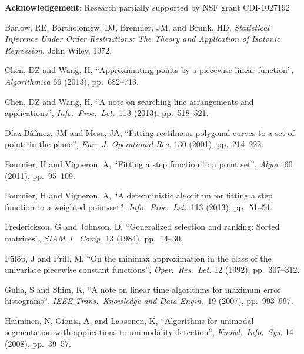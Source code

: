 \documentclass[11pt]{article}
\newcommand{\bibshrink}{\vspace{-0.04in}}
\begin{document}
\medskip
\noindent \textbf{Acknowledgement}: Research partially supported by NSF grant CDI-1027192




\begin{thebibliography}{99}


 Barlow, RE, Bartholomew, DJ, Bremner, JM, and Brunk, HD,
  \textit{Statistical Inference Under Order Restrictions: The Theory and Application of Isotonic Regression}, John Wiley, 1972.
\bibshrink
  
  Chen, DZ and Wang, H,
  ``Approximating points by a piecewise linear function'',
  \textit{Algorithmica} 66 (2013), pp.\ 682--713.
\bibshrink

 Chen, DZ and Wang, H,
  ``A note on searching line arrangements and applications'',
  \textit{Info.\ Proc.\ Let.}\ 113 (2013), pp.~518--521.
\bibshrink
  
  D\'{i}az-B\'{a}\~{n}nez, JM and Mesa, JA,
  ``Fitting rectilinear polygonal curves to a set of points in the plane'',
  \textit{Eur.\ J. Operational Res.} 130 (2001), pp.~214--222.
\bibshrink
   
 Fournier, H and Vigneron, A,
  ``Fitting a step function to a point set'',
  \textit{Algor.} 60 (2011), pp.~95--109.
\bibshrink
  
 Fournier, H and Vigneron, A,
  ``A deterministic algorithm for fitting a step function to a weighted point-set'',
  \textit{Info.\ Proc.\ Let.}\ 113 (2013), pp.\ 51--54.
\bibshrink
  
  Frederickson, G and Johnson, D,
  ``Generalized selection and ranking: Sorted matrices'',
  \textit{SIAM J.\ Comp.} 13 (1984), pp.~14--30.
\bibshrink
  
 F\"{u}l\"{o}p, J and Prill, M,
  ``On the minimax approximation in the class of the univariate piecewise constant functions'',
  \textit{Oper.\ Res.\ Let.} 12 (1992), pp.~307--312.
\bibshrink
  
  Guha, S and Shim, K,
  ``A note on linear time algorithms for maximum error histograms'',
  \textit{IEEE Trans.\ Knowledge and Data Engin.}\ 19 (2007), pp.~993--997.
\bibshrink
    
   Haiminen, N, Gionis, A, and Laasonen, K,
  ``Algorithms for unimodal segmentation with applications to unimodality detection'',
  \textit{Knowl.\ Info.\ Sys.} 14 (2008), pp.~39--57.
\bibshrink


\end{thebibliography}
\end{document}
